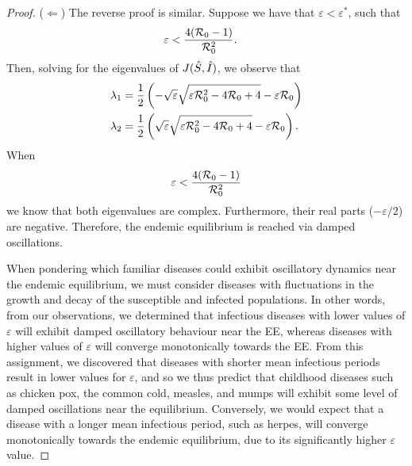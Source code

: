 \documentclass[12pt]{article}\usepackage[]{graphicx}\usepackage[]{color}
\begin{document}
\begin{enumerate}[(a)]
{\begin{proof}
{($\Longleftarrow$) The reverse proof is similar. Suppose we have that $\varepsilon < \varepsilon^{\ast}$, such that
\begin{equation} \label{cond}
\begin{aligned}
\varepsilon &< \frac{4({\cal R}_0 - 1)}{{\cal R}_0 ^2}.
\end{aligned}
\end{equation}
Then, solving for the eigenvalues of $J(\Hat{S}, \Hat{I})$, we observe that
$$
\begin{aligned}
\lambda_1 &= \frac{1}{2} \left(- \sqrt{\varepsilon} \sqrt{\varepsilon{\cal R}_0^2 - 4 {\cal R}_0 + 4} - \varepsilon {\cal R}_0\right)\\
\lambda_2 &= \frac{1}{2}\left(\sqrt{\varepsilon} \sqrt{\varepsilon{\cal R}_0^2 - 4 {\cal R}_0 + 4} - \varepsilon {\cal R}_0\right).
\end{aligned}
$$
When 
$$
\varepsilon < \frac{4({\cal R}_0 - 1)}{{\cal R}_0 ^2}
$$
we know that both eigenvalues are complex. Furthermore, their real parts ($-\varepsilon/2$) are negative.
Therefore, the endemic equilibrium is reached via damped oscillations. 

When pondering which familiar diseases could exhibit oscillatory dynamics near the endemic equilibrium, we must consider diseases with fluctuations in the growth and decay of the susceptible and infected populations. In other words, from our observations, we determined that infectious diseases with lower values of $\varepsilon$ will exhibit damped oscillatory behaviour near the EE, whereas diseases with higher values of $\varepsilon$ will converge monotonically towards the EE. From this assignment, we discovered that diseases with shorter mean infectious periods result in lower values for $\varepsilon$, and so we thus predict that childhood diseases such as chicken pox, the common cold, measles, and mumps will exhibit some level of damped oscillations near the equilibrium. Conversely, we would expect that a disease with a longer mean infectious period, such as herpes, will converge monotonically towards the endemic equilibrium, due to its significantly higher $\varepsilon$ value.
}\end{proof}}


\end{enumerate}
\end{document}
